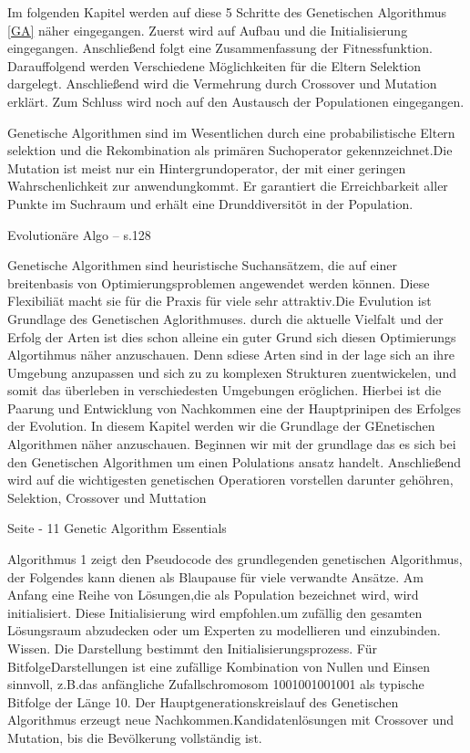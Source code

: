 Im folgenden Kapitel werden auf diese 5 Schritte des Genetischen Algorithmus \ref{GA} näher eingegangen. Zuerst wird auf Aufbau und die Initialisierung eingegangen. Anschließend folgt eine Zusammenfassung der Fitnessfunktion. Darauffolgend werden Verschiedene Möglichkeiten für die Eltern Selektion dargelegt. Anschließend wird die Vermehrung durch Crossover und Mutation erklärt. Zum Schluss wird noch auf den Austausch der Populationen eingegangen. 


\iffalse
Genetische Algorithmen sind im Wesentlichen durch eine probabilistische Eltern selektion und die Rekombination als primären Suchoperator gekennzeichnet.Die Mutation ist meist nur ein Hintergrundoperator, der mit einer geringen Wahrschenlichkeit zur anwendungkommt. Er garantiert die Erreichbarkeit aller Punkte im Suchraum und erhält eine Drunddiversitöt in der Population.

Evolutionäre Algo -- s.128


Genetische Algorithmen sind heuristische Suchansätzem, die auf einer breitenbasis von Optimierungsproblemen angewendet werden können. Diese Flexibiliät macht sie für die Praxis für viele sehr attraktiv.Die Evulution ist Grundlage des Genetischen Aglorithmuses. durch die aktuelle Vielfalt und der Erfolg der Arten ist dies schon alleine ein guter Grund sich diesen Optimierungs Algortihmus näher anzuschauen. Denn sdiese Arten sind in der lage sich an ihre Umgebung anzupassen und sich zu zu komplexen Strukturen zuentwickelen, und somit das überleben in verschiedesten Umgebungen eröglichen. Hierbei ist die Paarung und Entwicklung von Nachkommen eine der Hauptprinipen des Erfolges der Evolution. In diesem Kapitel werden wir die Grundlage der GEnetischen Algorithmen näher anzuschauen. Beginnen wir mit der grundlage das es sich bei den Genetischen Algorithmen um einen Polulations ansatz handelt. Anschließend wird auf die wichtigesten genetischen Operatioren vorstellen darunter gehöhren, Selektion, Crossover und Muttation

Seite - 11 Genetic Algorithm Essentials


Algorithmus 1 zeigt den Pseudocode des grundlegenden genetischen Algorithmus, der Folgendes kann dienen als Blaupause für viele verwandte Ansätze. Am Anfang eine Reihe von Lösungen,die als Population bezeichnet wird, wird initialisiert. Diese Initialisierung wird empfohlen.um zufällig den gesamten Lösungsraum abzudecken oder um Experten zu modellieren und einzubinden. Wissen. Die Darstellung bestimmt den Initialisierungsprozess. Für BitfolgeDarstellungen ist eine zufällige Kombination von Nullen und Einsen sinnvoll, z.B.das anfängliche Zufallschromosom 1001001001001 als typische Bitfolge der Länge 10. Der Hauptgenerationskreislauf des Genetischen Algorithmus erzeugt neue Nachkommen.Kandidatenlösungen mit Crossover und Mutation, bis die Bevölkerung vollständig ist.

